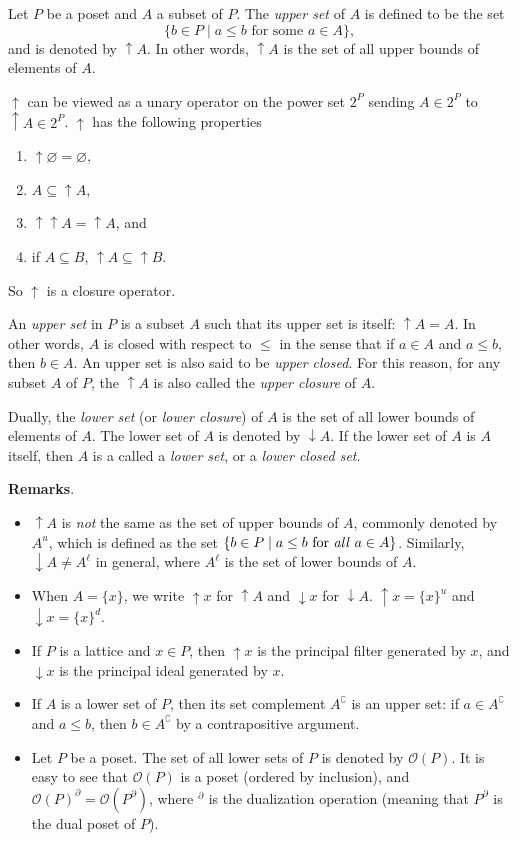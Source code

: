 \documentclass[12pt]{article}
\newcommand{\up}{\uparrow\!\!}
\newcommand{\down}{\downarrow\!\!}
\begin{document}
Let $P$ be a poset and $A$ a subset of $P$.  The \emph{upper set} of $A$ is defined to be the set 
$$\lbrace b\in P\mid a\le b \mbox{ for some } a\in A\rbrace,$$
and is denoted by $\up A$.  In other words, $\up A$ is the set of all upper bounds of elements of $A$.

$\uparrow$ can be viewed as a unary operator on the power set $2^P$ sending $A\in 2^P$ to $\up A \in 2^P$.  $\uparrow$ has the following properties 
\begin{enumerate}
\item $\up \varnothing=\varnothing$,
\item $A\subseteq \up A$,
\item $\uparrow \up A=\up A$, and 
\item if $A\subseteq B$, $\up A\subseteq \up B$.
\end{enumerate}
So $\uparrow$ is a closure operator.

An \emph{upper set} in $P$ is a subset $A$ such that its upper set is itself: $\up A=A$.  In other words, $A$ is closed with respect to $\le$ in the sense that if $a\in A$ and $a\le b$, then $b\in A$.  An upper set is also said to be \emph{upper closed}.  For this reason, for any subset $A$ of $P$, the $\up A$ is also called the \emph{upper closure} of $A$.

Dually, the \emph{lower set} (or \emph{lower closure}) of $A$ is the set of all lower bounds of elements of $A$.  The lower set of $A$ is denoted by $\down A$.  If the lower set of $A$ is $A$ itself, then $A$ is a called a \emph{lower set}, or a \emph{lower closed set}.

\textbf{Remarks}.  
\begin{itemize}
\item $\up A$ is \emph{not} the same as the set of upper bounds of $A$, commonly denoted by $A^u$, which is defined as the set $\lbrace b\in P\mid a\le b\mbox{ for \emph{all} }a\in A\rbrace$.  Similarly, $\down A\neq A^{\ell}$ in general, where $A^{\ell}$ is the set of lower bounds of $A$.
\item When $A=\lbrace x\rbrace$, we write $\up x$ for $\up A$ and $\down x$ for $\down A$.  $\up x = \lbrace x\rbrace ^u$ and $\down x=\lbrace x\rbrace ^d$.
\item If $P$ is a lattice and $x\in P$, then $\up x$ is the principal filter generated by $x$, and $\down x$ is the principal ideal generated by $x$.
\item If $A$ is a lower set of $P$, then its set complement $A^{\complement}$ is an upper set: if $a\in A^{\complement}$ and $a\le b$, then $b\in A^{\complement}$ by a contrapositive argument.
\item Let $P$ be a poset.  The set of all lower sets of $P$ is denoted by $\mathcal{O}(P)$.  It is easy to see that $\mathcal{O}(P)$ is a poset (ordered by inclusion), and $\mathcal{O}(P)^{\partial}=\mathcal{O}(P^{\partial})$, where $^{\partial}$ is the dualization operation (meaning that $P^{\partial}$ is the dual poset of $P$).
\end{itemize}
\end{document}
